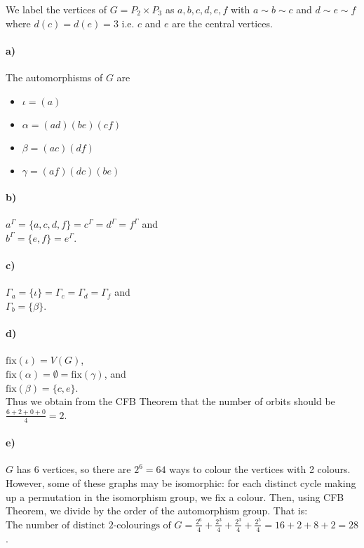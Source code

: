 We label the vertices of $G = P_2 \times P_3$ as {$a,b,c,d,e,f$} 
with $a \sim b \sim c$ and $d \sim e \sim f$ where $d(c) = d(e) = 3$
i.e. $c$ and $e$ are the central vertices.
\paragraph*{a)} The automorphisms of $G$ are 
\begin{itemize}
\item $\iota = (a)$\\
\item $\alpha = (ad)(be)(cf)$\\
\item $\beta = (ac)(df)$\\
\item $\gamma = (af)(dc)(be)$
\end{itemize}

\paragraph*{b)} $a^{\Gamma} = \{ a,c,d,f \} = c^{\Gamma} = d^{\Gamma} = f^{\Gamma}$ and\\
$b^{\Gamma} = \{ e,f \} = e^{\Gamma}$.

\paragraph*{c)} $\Gamma_a = \{ \iota \} = \Gamma_c = \Gamma_d = \Gamma_f$ and\\
$\Gamma_b = \{ \beta \}$.

\paragraph*{d)} $\text{fix}(\iota) = V(G)$,\\
$\text{fix}(\alpha) = \emptyset = \text{fix}(\gamma)$, and\\
$\text{fix}(\beta) = \{c,e \}$. \\
Thus we obtain from the CFB Theorem that the number
of orbits should be $\frac{6 + 2 + 0 + 0}{4} = 2$.

\paragraph*{e)} $G$ has 6 vertices, so there are $2^6 = 64$ ways 
to colour the vertices with 2 colours. 
However, some of these graphs may be isomorphic: 
for each distinct cycle making up a permutation in the isomorphism group, 
we fix a colour. Then, using CFB Theorem, we divide by the order of the automorphism group. 
That is:
$\text{The number of distinct 2-colourings of $G$} = \frac{2^6}{4} + \frac{2^3}{4} + \frac{2^3}{4} + \frac{2^5}{4} = 16 + 2 +8 + 2 = 28$.
